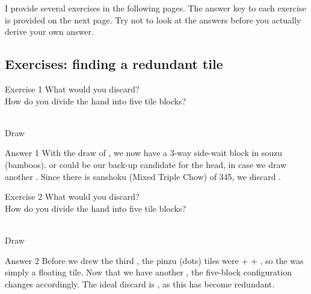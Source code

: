 \bigskip
I provide several exercises in the following pages. The answer key to each exercise is provided on the next page. Try not to look at the answers before you actually derive your own answer.

\vfill

\subsection*{Exercises: finding a redundant tile}

\bigskip

\begin{itembox}[l]{Exercise 1}
What would you discard? \\
\vsp
How do you divide the hand into five tile blocks?

\bp
{}~\\
\hfill\footnotesize{Draw~~~~~~~~~~~}
\ep
\end{itembox}

\newpage

\begin{itembox}[r]{Answer 1}
\emj
With the draw of {\LARGE{}}, we now have a 3-way side-wait block in {\jap souzu} (bamboos). {\LARGE{}} or {\LARGE{}} could be our back-up candidate for the head, in case we draw another {\LARGE{}}. Since there is {\jap sanshoku} (Mixed Triple Chow) of 345, we discard {\LARGE{}}.
\end{itembox}

\vfill

\begin{itembox}[l]{Exercise 2}
What would you discard? \\
\vsp
How do you divide the hand into five tile blocks?

\bp
{}~\\
\hfill\footnotesize{Draw~~~~~~~~~~~}
\ep
\end{itembox}

\newpage


\bigskip
\begin{itembox}[r]{Answer 2}
\emj
Before we drew the third {\LARGE{}}, the {\jap pinzu} (dots) tiles were {\LARGE{} +  + }, so the {\LARGE{}} was simply a floating tile. Now that we have another {\LARGE{}}, the five-block configuration changes accordingly. The ideal discard is {\LARGE{}}, as this has become redundant.
\end{itembox}

